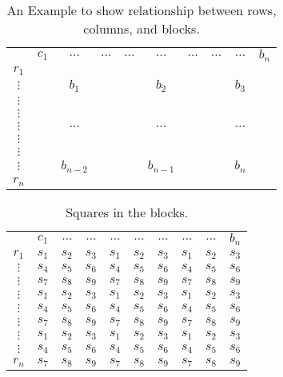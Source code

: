 \documentclass[11pt]{report}
\begin{document}
\begin{table}
\centering
\begin{tabular}{ c| c c c| c c c| c c c|}
  \multicolumn{1}{c}{} & $c_{1}$ &  $\dots$ & \multicolumn{1}{c}{$\dots$} & $\dots$ & $\dots$ & \multicolumn{1}{c}{$\dots$} & $\dots$ & $\dots$ & \multicolumn{1}{c}{$b_{n}$}\\ \cline{2-10}
   $r_{1}$ & & & & & & & & &\\
   $\vdots$ & & $b_{1}$ & & & $b_{2}$ & & & $b_{3}$ &\\
   $\vdots$ & & & & & & & & &\\ \cline{2-10}
   $\vdots$ & & & & & & & & &\\
   $\vdots$ & & $\dots$ & & & $\dots$ & & & $\dots$ &\\
   $\vdots$ & & & & & & & & &\\ \cline{2-10}
   $\vdots$ & & & & & & & & &\\
   $\vdots$ & & $b_{n-2}$ & & & $b_{n-1}$ & & & $b_{n}$ &\\
   $r_{n}$ & & & & & & & & &\\ \cline{2-10}
\end{tabular}
\label{blockOrder}
\caption{An Example to show relationship between rows, columns, and blocks.}
\end{table}

\begin{table}
\centering
\begin{tabular}{ c| c c c| c c c| c c c|}
  \multicolumn{1}{c}{} & $c_{1}$ &  $\dots$ & \multicolumn{1}{c}{$\dots$} & $\dots$ & $\dots$ & \multicolumn{1}{c}{$\dots$} & $\dots$ & $\dots$ & \multicolumn{1}{c}{$b_{n}$}\\ \cline{2-10}
   $r_{1}$ & $s_{1}$ &  $s_{2}$ & $s_{3}$ & $s_{1}$ & $s_{2}$ & $s_{3}$ & $s_{1}$ & $s_{2}$ & $s_{3}$\\
   $\vdots$ & $s_{4}$ & $s_{5}$ & $s_{6}$ & $s_{4}$ & $s_{5}$ & $s_{6}$ &  $s_{4}$ & $s_{5}$ & $s_{6}$\\
   $\vdots$ & $s_{7}$ & $s_{8}$ & $s_{9}$ & $s_{7}$ & $s_{8}$ & $s_{9}$ & $s_{7}$ & $s_{8}$ & $s_{9}$\\ \cline{2-10}
   $\vdots$ & $s_{1}$ &  $s_{2}$ & $s_{3}$ & $s_{1}$ & $s_{2}$ & $s_{3}$ & $s_{1}$ & $s_{2}$ & $s_{3}$\\
   $\vdots$ & $s_{4}$ & $s_{5}$ & $s_{6}$ & $s_{4}$ & $s_{5}$ & $s_{6}$ &  $s_{4}$ & $s_{5}$ & $s_{6}$\\
   $\vdots$ & $s_{7}$ & $s_{8}$ & $s_{9}$ & $s_{7}$ & $s_{8}$ & $s_{9}$ & $s_{7}$ & $s_{8}$ & $s_{9}$\\ \cline{2-10}
   $\vdots$ & $s_{1}$ &  $s_{2}$ & $s_{3}$ & $s_{1}$ & $s_{2}$ & $s_{3}$ & $s_{1}$ & $s_{2}$ & $s_{3}$\\
   $\vdots$ & $s_{4}$ & $s_{5}$ & $s_{6}$ & $s_{4}$ & $s_{5}$ & $s_{6}$ &  $s_{4}$ & $s_{5}$ & $s_{6}$\\
   $r_{n}$ & $s_{7}$ & $s_{8}$ & $s_{9}$ & $s_{7}$ & $s_{8}$ & $s_{9}$ & $s_{7}$ & $s_{8}$ & $s_{9}$\\ \cline{2-10}
\end{tabular}
\label{Square}
\caption{Squares in the blocks.}
\end{table}
\end{document}
